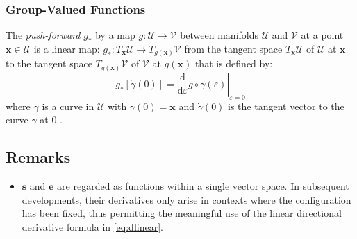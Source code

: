 \hypertarget{push-forward}{%
\subsubsection{Group-Valued Functions}\label{sec:push-forward}}
The \emph{push-forward} $g_*$ by a map $g: \mathcal{U} \rightarrow \mathcal{V}$ between manifolds $\mathcal{U}$ and $\mathcal{V}$ 
at a point $\boldsymbol{x}\in\mathcal{U}$ is a linear map:
\(g_*: T_{\boldsymbol{x}} \mathcal{U} \rightarrow T_{g(\boldsymbol{x})} \mathcal{V}\)
from the tangent space \(T_{\boldsymbol{x}} \mathcal{U}\) of \(\mathcal{U}\) at \(\boldsymbol{x}\)
to the tangent space \(T_{g(\boldsymbol{x})} \mathcal{V}\)
of \(\mathcal{V}\) at \(g(\boldsymbol{x})\) that is defined by:
%
\begin{equation*}
g_*\left[\dot{\gamma}(0)\right]=\left.\frac{\mathrm{d}}{\mathrm{d}\varepsilon} g \circ \gamma(\varepsilon) \right|_{\varepsilon=0}
\end{equation*}
%
where \(\gamma\) is a curve in \(\mathcal{U}\) with \(\gamma(0)=\boldsymbol{x}\) and
\(\dot{\gamma}(0)\) is the tangent vector to the curve \(\gamma\) at \(0\) .

\hypertarget{remarks02}{%
\subsection{Remarks}\label{remarks02}}
\begin{itemize}
\item
  \(\boldsymbol{s}\) and \(\boldsymbol{e}\) are regarded as functions within a single vector
  space. In subsequent developments, their derivatives only arise in
  contexts where the configuration has been fixed, thus permitting the meaningful
  use of the linear directional derivative formula in \eqref{eq:dlinear}.
\end{itemize}
